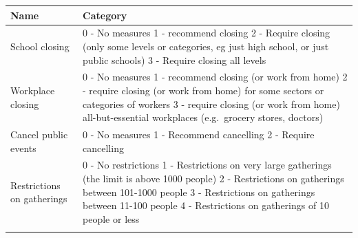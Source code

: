 \documentclass[
  6pt,
]{article}
\begin{document}
\begin{longtable}[]{@{}ll@{}}
\toprule
\begin{minipage}[b]{0.09\columnwidth}\raggedright
\textbf{Name}\strut
\end{minipage} & \begin{minipage}[b]{0.85\columnwidth}\raggedright
\textbf{Category}\strut
\end{minipage}\tabularnewline
\midrule
\endhead
\begin{minipage}[t]{0.09\columnwidth}\raggedright
School closing\strut
\end{minipage} & \begin{minipage}[t]{0.85\columnwidth}\raggedright
0 - No measures 1 - recommend closing 2 - Require closing (only some
levels or categories, eg just high school, or just public schools) 3 -
Require closing all levels\strut
\end{minipage}\tabularnewline
\begin{minipage}[t]{0.09\columnwidth}\raggedright
Workplace closing\strut
\end{minipage} & \begin{minipage}[t]{0.85\columnwidth}\raggedright
0 - No measures 1 - recommend closing (or work from home) 2 - require
closing (or work from home) for some sectors or categories of workers 3
- require closing (or work from home) all-but-essential workplaces
(e.g.~grocery stores, doctors)\strut
\end{minipage}\tabularnewline
\begin{minipage}[t]{0.09\columnwidth}\raggedright
Cancel public events\strut
\end{minipage} & \begin{minipage}[t]{0.85\columnwidth}\raggedright
0 - No measures 1 - Recommend cancelling 2 - Require cancelling\strut
\end{minipage}\tabularnewline
\begin{minipage}[t]{0.09\columnwidth}\raggedright
Restrictions on gatherings\strut
\end{minipage} & \begin{minipage}[t]{0.85\columnwidth}\raggedright
0 - No restrictions 1 - Restrictions on very large gatherings (the limit
is above 1000 people) 2 - Restrictions on gatherings between 101-1000
people 3 - Restrictions on gatherings between 11-100 people 4 -
Restrictions on gatherings of 10 people or less\strut
\end{minipage}\tabularnewline
\begin{minipage}[t]{0.09\columnwidth}\raggedright

\end{minipage}
\end{longtable}
\end{document}
